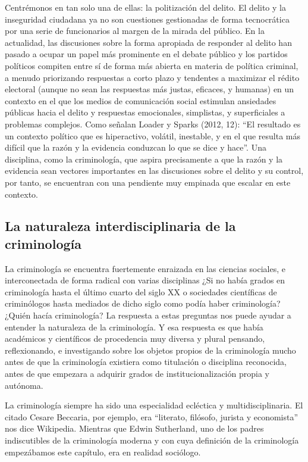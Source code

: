 \documentclass[
  spanish,
  letterpaper,
  DIV=11,
  numbers=noendperiod]{scrreprt}
\begin{document}
Centrémonos en tan solo una de ellas: la politización del delito. El
delito y la inseguridad ciudadana ya no son cuestiones gestionadas de
forma tecnocrática por una serie de funcionarios al margen de la mirada
del público. En la actualidad, las discusiones sobre la forma apropiada
de responder al delito han pasado a ocupar un papel más prominente en el
debate público y los partidos políticos compiten entre sí de forma más
abierta en materia de política criminal, a menudo priorizando respuestas
a corto plazo y tendentes a maximizar el rédito electoral (aunque no
sean las respuestas más justas, eficaces, y humanas) en un contexto en
el que los medios de comunicación social estimulan ansiedades públicas
hacia el delito y respuestas emocionales, simplistas, y superficiales a
problemas complejos. Como señalan Loader y Sparks (2012, 12): ``El
resultado es un contexto político que es hiperactivo, volátil,
inestable, y en el que resulta más difícil que la razón y la evidencia
conduzcan lo que se dice y hace''. Una disciplina, como la criminología,
que aspira precisamente a que la razón y la evidencia sean vectores
importantes en las discusiones sobre el delito y su control, por tanto,
se encuentran con una pendiente muy empinada que escalar en este
contexto.

\subsection{La naturaleza interdisciplinaria de la
criminología}\label{la-naturaleza-interdisciplinaria-de-la-criminologuxeda}

La criminología se encuentra fuertemente enraizada en las ciencias
sociales, e interconectada de forma radical con varias disciplinas ¿Si
no había grados en criminología hasta el último cuarto del siglo XX o
sociedades científicas de criminólogos hasta mediados de dicho siglo
como podía haber criminología? ¿Quién hacía criminología? La respuesta a
estas preguntas nos puede ayudar a entender la naturaleza de la
criminología. Y esa respuesta es que había académicos y científicos de
procedencia muy diversa y plural pensando, reflexionando, e investigando
sobre los objetos propios de la criminología mucho antes de que la
criminología existiera como titulación o disciplina reconocida, antes de
que empezara a adquirir grados de institucionalización propia y
autónoma.

La criminología siempre ha sido una especialidad ecléctica y
multidisciplinaria. El citado Cesare Beccaria, por ejemplo, era
``literato, filósofo, jurista y economista'' nos dice Wikipedia.
Mientras que Edwin Sutherland, uno de los padres indiscutibles de la
criminología moderna y con cuya definición de la criminología
empezábamos este capítulo, era en realidad sociólogo.
\end{document}
